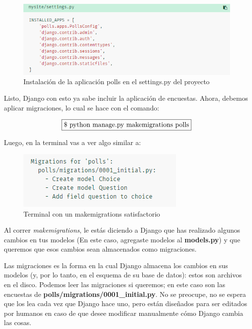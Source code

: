 \documentclass[10pt]{article}
\newcommand{\django}[1]{{\textcolor{G}{Django} #1}}
\begin{document}
\begin{figure}[H]
	\begin{center}
		\includegraphics[scale=0.9]{figuras/323/img1.png}
		\renewcommand{\arraystretch}{1.3}
		\caption{Instalación de la aplicación polls en el \textcolor{G}{settings.py} del proyecto }
	\end{center}
\end{figure}


Listo, \django{} con esto ya sabe incluir la aplicación de encuestas. Ahora, debemos aplicar migraciones, lo cual se hace con el comando:

$$\fbox{\$ python manage.py makemigrations polls}$$

Luego, en la terminal vas a ver algo similar a:

\begin{figure}[H]
\begin{center}
\includegraphics[scale=1]{figuras/323/img2.png}
\renewcommand{\arraystretch}{1.3}
\caption{Terminal con un makemigrations satisfactorio}
\end{center}
\end{figure}


Al correr \textit{makemigrations}, le estás diciendo a Django que has realizado algunos cambios en tus modelos (En este caso, agregaste modelos al \textbf{models.py}) y que queremos que esos cambios sean almacenados como migraciones.


Las migraciones es la forma en la cual \django{} almacena los cambios en sus modelos (y, por lo tanto, en el esquema de su base de datos): estos son archivos en el disco. Podemos leer las migraciones si queremos; en este caso son las encuestas de \textbf{polls/migrations/0001\_initial.py}. No se preocupe, no se espera que los lea cada vez que Django hace uno, pero están diseñados para ser editados por humanos en caso de que desee modificar manualmente cómo \django{} cambia las cosas.
\end{document}
